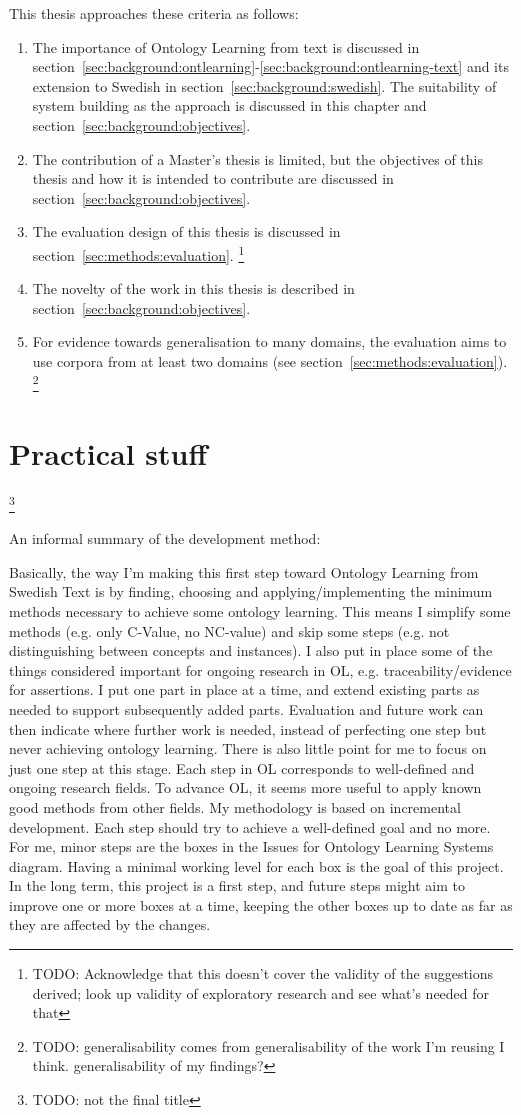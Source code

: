 \documentclass[a4paper]{report}
\newcommand{\todo}[1]{\footnote{{\color{red} TODO: #1}}}
\begin{document}
This thesis approaches these criteria as follows:
\begin{enumerate}
\item The importance of Ontology Learning from text is discussed in section~\ref{sec:background:ontlearning}-\ref{sec:background:ontlearning-text} and its extension to Swedish in section~\ref{sec:background:swedish}.
The suitability of system building as the approach is discussed in this chapter and section~\ref{sec:background:objectives}.
\item The contribution of a Master's thesis is limited, but the objectives of this thesis and how it is intended to contribute are discussed in section~\ref{sec:background:objectives}.
\item The evaluation design of this thesis is discussed in section~\ref{sec:methods:evaluation}.
\todo{Acknowledge that this doesn't cover the validity of the suggestions derived; look up validity of exploratory research and see what's needed for that}
\item The novelty of the work in this thesis is described in section~\ref{sec:background:objectives}.
\item For evidence towards generalisation to many domains, the evaluation aims to use corpora from at least two domains (see section~\ref{sec:methods:evaluation}).
\todo{generalisability comes from generalisability of the work I'm reusing I think. generalisability of my findings?}
\end{enumerate}

\section{Practical stuff}
\todo{not the final title}

An informal summary of the development method:

Basically, the way I'm making this first step toward Ontology Learning from Swedish Text is by finding, choosing and applying/implementing the minimum methods necessary to achieve some ontology learning. This means I simplify some methods (e.g. only C-Value, no NC-value) and skip some steps (e.g. not distinguishing between concepts and instances). I also put in place some of the things considered important for ongoing research in OL, e.g. traceability/evidence for assertions. I put one part in place at a time, and extend existing parts as needed to support subsequently added parts. Evaluation and future work can then indicate where further work is needed, instead of perfecting one step but never achieving ontology learning. There is also little point for me to focus on just one step at this stage. Each step in OL corresponds to well-defined and ongoing research fields. To advance OL, it seems more useful to apply known good methods from other fields. My methodology is based on incremental development. Each step should try to achieve a well-defined goal and no more. For me, minor steps are the boxes in the Issues for Ontology Learning Systems diagram. Having a minimal working level for each box is the goal of this project. In the long term, this project is a first step, and future steps might aim to improve one or more boxes at a time, keeping the other boxes up to date as far as they are affected by the changes.
\end{document}
